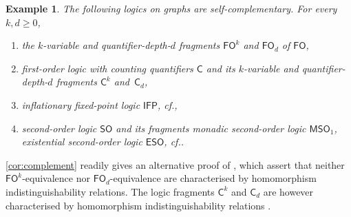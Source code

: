 \documentclass[3p,final]{elsarticle}
\newtheorem{lemma}[theorem]{Lemma}
\newtheorem{example}[theorem]{Example}
\begin{document}
	\begin{example} \label{ex:logics} \label{ex:fo-fragment} \label{ex:counting}
		The following logics on graphs are self-complementary. For every $k, d \geq 0$,
		\begin{enumerate}
			\item the $k$-variable and quantifier-depth-$d$ fragments $\mathsf{FO}^k$ and $\mathsf{FO}_d$ of $\mathsf{FO}$,
			\item first-order logic with counting quantifiers $\mathsf{C}$ and its $k$-variable and quantifier-depth-$d$ fragments $\mathsf{C}^k$ and~$\mathsf{C}_d$,
			\item inflationary fixed-point logic $\mathsf{IFP}$, cf.\@ \cite{grohe_descriptive_2017},
			\item second-order logic $\mathsf{SO}$ and its fragments monadic second-order logic $\mathsf{MSO}_1$, existential second-order logic $\mathsf{ESO}$, cf.\@ \cite{courcelle_monadic_1994,blass_model_2010}.
		\end{enumerate}
	\end{example}
		\cref{cor:complement} readily gives an alternative proof of \cite[Propositions~1 and~2]{atserias_expressive_2021}, which assert that neither $\mathsf{FO}^k$-equivalence nor $\mathsf{FO}_d$-equivalence are characterised by homomorphism indistinguishability relations.
	The logic fragments $\mathsf{C}^k$ and $\mathsf{C}_d$ are however characterised by homomorphism indistinguishability relations \cite{dvorak_recognizing_2010,grohe_counting_2020}.
	
%	

%	

	
%	
	
\end{document}
